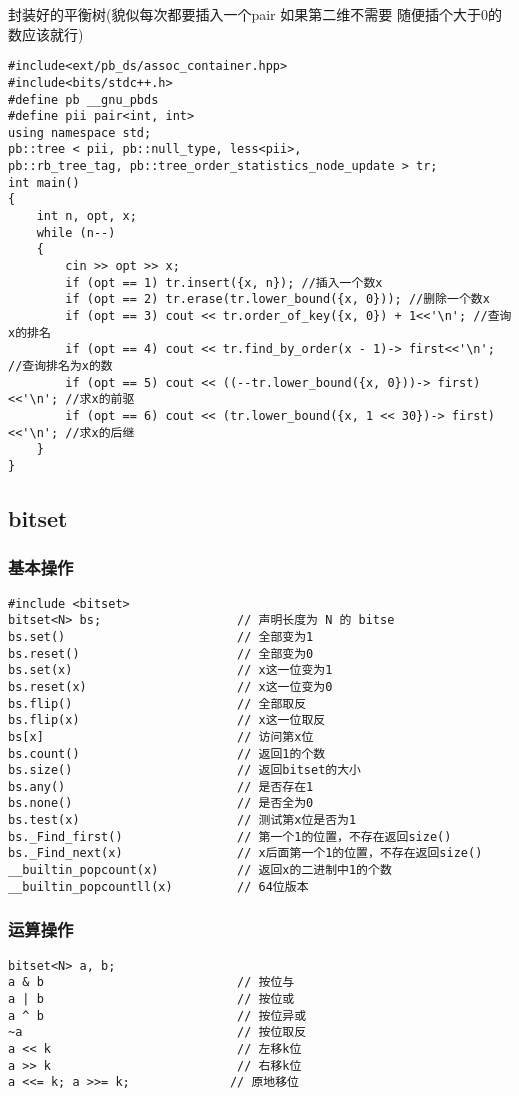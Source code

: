 \documentclass[a4paper, fontset=none]{ctexart}
\begin{document}
封装好的平衡树(貌似每次都要插入一个pair 如果第二维不需要 随便插个大于0的数应该就行)

\begin{verbatim}
#include<ext/pb_ds/assoc_container.hpp>
#include<bits/stdc++.h>
#define pb __gnu_pbds
#define pii pair<int, int>
using namespace std;
pb::tree < pii, pb::null_type, less<pii>,
pb::rb_tree_tag, pb::tree_order_statistics_node_update > tr;
int main()
{
    int n, opt, x;
    while (n--)
    {
        cin >> opt >> x;
        if (opt == 1) tr.insert({x, n}); //插入一个数x
        if (opt == 2) tr.erase(tr.lower_bound({x, 0})); //删除一个数x
        if (opt == 3) cout << tr.order_of_key({x, 0}) + 1<<'\n'; //查询x的排名
        if (opt == 4) cout << tr.find_by_order(x - 1)-> first<<'\n'; //查询排名为x的数
        if (opt == 5) cout << ((--tr.lower_bound({x, 0}))-> first)<<'\n'; //求x的前驱
        if (opt == 6) cout << (tr.lower_bound({x, 1 << 30})-> first)<<'\n'; //求x的后继
    }
}
\end{verbatim}
\subsection{bitset}

\subsubsection{基本操作}
\begin{verbatim}
#include <bitset>
bitset<N> bs;                   // 声明长度为 N 的 bitse
bs.set()                        // 全部变为1
bs.reset()                      // 全部变为0
bs.set(x)                       // x这一位变为1
bs.reset(x)                     // x这一位变为0
bs.flip()                       // 全部取反
bs.flip(x)                      // x这一位取反
bs[x]                           // 访问第x位
bs.count()                      // 返回1的个数
bs.size()                       // 返回bitset的大小
bs.any()                        // 是否存在1
bs.none()                       // 是否全为0
bs.test(x)                      // 测试第x位是否为1
bs._Find_first()                // 第一个1的位置，不存在返回size()
bs._Find_next(x)                // x后面第一个1的位置，不存在返回size()
__builtin_popcount(x)           // 返回x的二进制中1的个数
__builtin_popcountll(x)         // 64位版本
\end{verbatim}

\subsubsection{运算操作}
\begin{verbatim}
bitset<N> a, b;
a & b                           // 按位与
a | b                           // 按位或
a ^ b                           // 按位异或
~a                              // 按位取反
a << k                          // 左移k位
a >> k                          // 右移k位
a <<= k; a >>= k;              // 原地移位
\end{verbatim}
\end{document}
